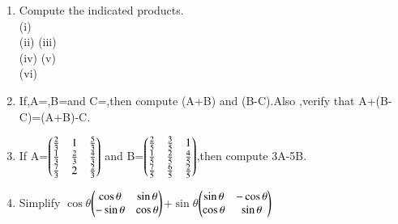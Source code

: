 \begin{enumerate}[label=\arabic*.,ref=\thesubsection.\theenumi]
\item Compute the indicated products.\\
(i) \\
(ii) (iii) \\
(iv) (v) \\
(vi) \\
\item If,A=,B=and C=,then compute (A+B) and (B-C).Also ,verify that A+(B-C)=(A+B)-C.\\
\item If A=$\begin{pmatrix}\frac{2}{3} & 1 & \frac{5}{3}\\ \frac{1}{3} & \frac{2}{3} & \frac{4}{3} \\ \frac{7}{3} &2  & \frac{2}{3}\end{pmatrix}$ and B=$\begin{pmatrix}\frac{2}{5} & \frac{3}{5} &1 \\ \frac{1}{5} & \frac{2}{5} & \frac{4}{5}\\ \frac{7}{5} & \frac{6}{5} & \frac{2}{5}\end{pmatrix}$,then compute 3A-5B.\\
\item Simplify $\cos\theta$$\begin{pmatrix}\cos\theta &\sin\theta\\ -\sin\theta &\cos\theta\end{pmatrix}$+$\sin\theta$$\begin{pmatrix}\sin\theta &-\cos\theta\\ \cos\theta &\sin\theta\end{pmatrix}$\\
\solution 


\end{enumerate}
